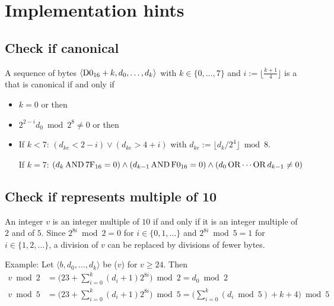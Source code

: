 \section{Implementation hints}
\label{sec:implementation}

\subsection{Check if canonical }
\label{sec:implementation:BinaryRationalValue:canonical}

A sequence of bytes $\langle \mathrm{D0}_{16} + k, d_0, \ldots, d_k\rangle$ with
$k \in \{0, \ldots, 7\}$ and $i := \lfloor \frac{k + 1}{4} \rfloor$
is a  that is canonical if and only if
\begin{itemize}
    \item
    $k = 0$ or then

    \item
    $2^{2 - i} d_0 \bmod 2^8 \ne 0$ or then

    \item
    If $k < 7$:
    $(d_{ke} < 2 - i) \vee (d_{ke} > 4 + i)$
    with $d_{ke} := \lfloor d_k / 2^4 \rfloor \bmod 8$.

    If $k = 7$:
    $(d_k \operatorname{AND} \mathrm{7F}_{16} = 0) \wedge (d_{k - 1} \operatorname{AND} \mathrm{F0}_{16} = 0)
    \wedge (d_0 \operatorname{OR} \cdots \operatorname{OR} d_{k - 1} \ne 0)$
\end{itemize}

\subsection{Check if  represents multiple of 10}
\label{sec:implementation:IntegerValue:10}

An integer $v$ is an integer multiple of $10$ if and only if it is an integer multiple
of $2$ and of $5$.
Since $2^{8i} \bmod 2 = 0$ for $i \in \{0, 1, \ldots\}$
and $2^{8i} \bmod 5 = 1$ for $i \in \{1, 2, \ldots\}$,
a division of $v$ can be replaced by divisions of fewer bytes.

Example:
Let $\langle b, d_0, \ldots, d_k\rangle$ be ($v$) for $v \ge 24$.
Then
\begin{align*}
    v \bmod 2
        & = \big(23 + \sum_{i = 0}^k (d_i + 1) 2^{8 i}\big) \bmod 2
        = d_0 \bmod 2 \\
    v \bmod 5
        & = \big(23 + \sum_{i = 0}^k (d_i + 1) 2^{8 i}\big) \bmod 5
        = \big(\sum_{i = 0}^k (d_i \bmod 5) + k + 4\big) \bmod 5
\end{align*}
